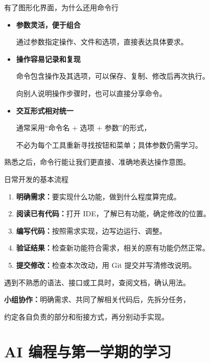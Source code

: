 \documentclass[aspectratio=169]{beamer}
\begin{document}
\begin{frame}{有了图形化界面，为什么还用命令行}
  \begin{itemize}
    \item \textbf{参数灵活，便于组合}\par
      通过参数指定操作、文件和选项，直接表达具体要求。
      \medskip
    \item \textbf{操作容易记录和复现}\par
      命令包含操作及其选项，可以保存、复制、修改后再次执行。\par
      向别人说明操作步骤时，也可以直接分享命令。
      \medskip
    \item \textbf{交互形式相对统一}\par
      通常采用“命令名 + 选项 + 参数”的形式，\par
      不必为每个工具重新寻找按钮和菜单；具体参数仍需学习。
  \end{itemize}
  \bigskip
  \alert{熟悉之后，命令行能让我们更直接、准确地表达操作意图。}
\end{frame}

\begin{frame}{日常开发的基本流程}
  \begin{enumerate}
    \item \textbf{明确需求：}要实现什么功能，做到什么程度算完成。
    \item \textbf{阅读已有代码：}打开 IDE，了解已有功能，确定修改的位置。
    \item \textbf{编写代码：}按照需求实现，边写边运行、调整。
    \item \textbf{验证结果：}检查新功能符合需求，相关的原有功能仍然正常。
    \item \textbf{提交修改：}检查本次改动，用 Git 提交并写清修改说明。
  \end{enumerate}
  \medskip
  \alert{遇到不熟悉的语法、接口或工具时，查阅文档，确认用法。}
  \par
  \bigskip
  \textbf{小组协作：}明确需求、共同了解相关代码后，先拆分任务，\par
  约定各自负责的部分和衔接方式，再分别动手实现。
\end{frame}

\section{AI 编程与第一学期的学习}
\end{document}
